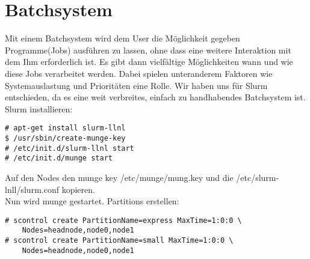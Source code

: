 \chapter{Batchsystem}
Mit einem Batchsystem wird dem User die Möglichkeit gegeben Programme(Jobs)
ausführen zu lassen, ohne dass eine weitere Interaktion mit dem Ihm erforderlich
ist.
Es gibt dann vielfältige Möglichkeiten wann und wie diese Jobs 
verarbeitet werden. Dabei spielen unteranderem Faktoren wie Systemauslastung und
Prioritäten eine Rolle.
Wir haben uns für Slurm entschieden, da es eine weit verbreites,
einfach zu handhabendes Batchsystem ist.\\
Slurm installieren:
\begin{lstlisting}[style=Bash]
# apt-get install slurm-llnl
$ /usr/sbin/create-munge-key
# /etc/init.d/slurm-llnl start
# /etc/init.d/munge start
\end{lstlisting}
Auf den Nodes den munge key /etc/munge/mung.key und die /etc/slurm-lnll/slurm.conf kopieren.\\
Nun wird munge gestartet.
Partitions erstellen:
\begin{lstlisting}[style=Bash]
# scontrol create PartitionName=express MaxTime=1:0:0 \
	Nodes=headnode,node0,node1
# scontrol create PartitionName=small MaxTime=1:0:0 \
	Nodes=headnode,node0,node1
\end{lstlisting}

